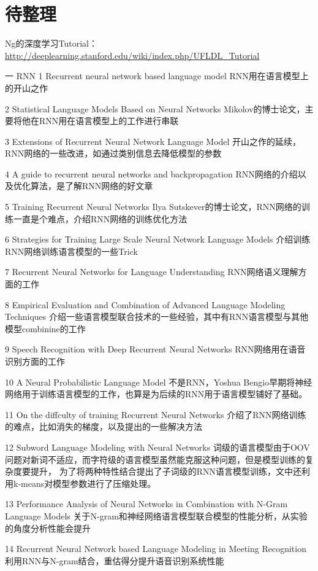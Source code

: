 \section{待整理}

Ng的深度学习Tutorial：\url{http://deeplearning.stanford.edu/wiki/index.php/UFLDL_Tutorial}

一 RNN
1 Recurrent neural network based language model
  RNN用在语言模型上的开山之作

2 Statistical Language Models Based on Neural Networks
  Mikolov的博士论文，主要将他在RNN用在语言模型上的工作进行串联

3 Extensions of Recurrent Neural Network Language Model
  开山之作的延续，RNN网络的一些改进，如通过类别信息去降低模型的参数

4 A guide to recurrent neural networks and backpropagation
  RNN网络的介绍以及优化算法，是了解RNN网络的好文章

5 Training Recurrent Neural Networks
  Ilya Sutskever的博士论文，RNN网络的训练一直是个难点，介绍RNN网络的训练优化方法

6 Strategies for Training Large Scale Neural Network Language Models
  介绍训练RNN网络训练语言模型的一些Trick

7 Recurrent Neural Networks for Language Understanding
  RNN网络语义理解方面的工作

8 Empirical Evaluation and Combination of Advanced Language Modeling Techniques
  介绍一些语言模型联合技术的一些经验，其中有RNN语言模型与其他模型combinine的工作

9 Speech Recognition with Deep Recurrent Neural Networks
  RNN网络用在语音识别方面的工作

10 A Neural Probabilistic Language Model
  不是RNN，Yoshua Bengio早期将神经网络用于训练语言模型的工作，也算是为后续的RNN用于语言模型铺好了基础。

11 On the diffculty of training Recurrent Neural Networks
  介绍了RNN网络训练的难点，比如消失的梯度，以及提出的一些解决方法

12 Subword Language Modeling with Neural Networks
   词级的语言模型由于OOV问题对新词不适应，而字符级的语言模型虽然能克服这种问题，但是模型训练的复杂度要提升，
   为了将两种特性结合提出了子词级的RNN语言模型训练，文中还利用k-means对模型参数进行了压缩处理。

13 Performance Analysis of Neural Networks in Combination with N-Gram Language Models
   关于N-gram和神经网络语言模型联合模型的性能分析，从实验的角度分析性能会提升

14 Recurrent Neural Network based Language Modeling in Meeting Recognition
   利用RNN与N-gram结合，重估得分提升语音识别系统性能

